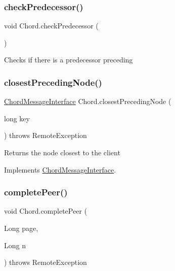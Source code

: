 \subsubsection{\texorpdfstring{check\+Predecessor()}{checkPredecessor()}}
{\footnotesize\ttfamily void Chord.\+check\+Predecessor (\begin{DoxyParamCaption}{ }\end{DoxyParamCaption})\hspace{0.3cm}{\ttfamily [inline]}}

Checks if there is a predecessor preceding \mbox{\label{class_chord_aecd3971877558c3b1290bd49d7576ab0}} 
\subsubsection{\texorpdfstring{closest\+Preceding\+Node()}{closestPrecedingNode()}}
{\footnotesize\ttfamily \mbox{\hyperlink{interface_chord_message_interface}{Chord\+Message\+Interface}} Chord.\+closest\+Preceding\+Node (\begin{DoxyParamCaption}\item[{long}]{key }\end{DoxyParamCaption}) throws Remote\+Exception\hspace{0.3cm}{\ttfamily [inline]}}

Returns the node closest to the client 

Implements \mbox{\hyperlink{interface_chord_message_interface}{Chord\+Message\+Interface}}.

\mbox{\label{class_chord_a0cc3d82d5173771fcbadb2ee6895d0f8}} 
\subsubsection{\texorpdfstring{complete\+Peer()}{completePeer()}}
{\footnotesize\ttfamily void Chord.\+complete\+Peer (\begin{DoxyParamCaption}\item[{Long}]{page,  }\item[{Long}]{n }\end{DoxyParamCaption}) throws Remote\+Exception\hspace{0.3cm}{\ttfamily [inline]}}

